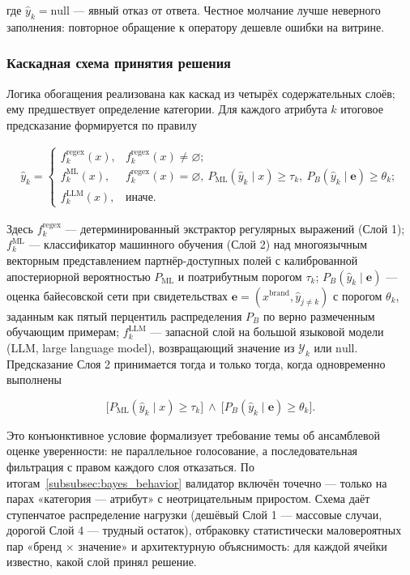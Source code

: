 где $\hat{y}_k = \text{null}$ — явный отказ от ответа. Честное молчание лучше неверного заполнения: повторное обращение к оператору дешевле ошибки на витрине.

\subsubsection{Каскадная схема принятия решения}

Логика обогащения реализована как каскад из четырёх содержательных слоёв; ему предшествует определение категории. Для каждого атрибута $k$ итоговое предсказание формируется по правилу

\begin{gather}
\label{eq:2.4}
\hat{y}_k =
\begin{cases}
f_k^{\text{regex}}(x), & f_k^{\text{regex}}(x) \neq \varnothing; \\[4pt]
f_k^{\text{ML}}(x), & f_k^{\text{regex}}(x) = \varnothing,\ P_{\text{ML}}(\hat{y}_k \mid x) \geq \tau_k,\ P_B(\hat{y}_k \mid \mathbf{e}) \geq \theta_k; \\[4pt]
f_k^{\text{LLM}}(x), & \text{иначе}.
\end{cases}
\end{gather}

Здесь $f_k^{\text{regex}}$ — детерминированный экстрактор регулярных выражений (Слой 1); $f_k^{\text{ML}}$ — классификатор машинного обучения (Слой 2) над многоязычным векторным представлением партнёр-доступных полей с калиброванной апостериорной вероятностью $P_{\text{ML}}$ и поатрибутным порогом $\tau_k$; $P_B(\hat{y}_k \mid \mathbf{e})$ — оценка байесовской сети при свидетельствах $\mathbf{e} = (x^{\text{brand}}, \hat{y}_{j \neq k})$ с порогом $\theta_k$, заданным как пятый перцентиль распределения $P_B$ по верно размеченным обучающим примерам; $f_k^{\text{LLM}}$ — запасной слой на большой языковой модели (LLM, large language model), возвращающий значение из $\mathcal{Y}_k$ или $\text{null}$. Предсказание Слоя 2 принимается тогда и только тогда, когда одновременно выполнены

\begin{equation}
\label{eq:2.5}
\bigl[P_{\text{ML}}(\hat{y}_k \mid x) \geq \tau_k\bigr] \ \wedge\ \bigl[P_B(\hat{y}_k \mid \mathbf{e}) \geq \theta_k\bigr].
\end{equation}

Это конъюнктивное условие формализует требование темы об ансамблевой оценке уверенности: не параллельное голосование, а последовательная фильтрация с правом каждого слоя отказаться. По итогам~\ref{subsubsec:bayes_behavior} валидатор включён точечно — только на парах «категория — атрибут» с неотрицательным приростом. Схема даёт ступенчатое распределение нагрузки (дешёвый Слой 1 — массовые случаи, дорогой Слой 4 — трудный остаток), отбраковку статистически маловероятных пар «бренд × значение» и архитектурную объяснимость: для каждой ячейки известно, какой слой принял решение.

